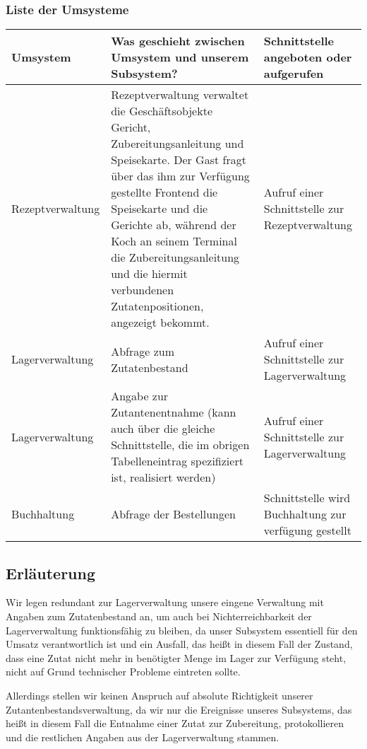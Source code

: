 \subsubsection{Liste der Umsysteme}

\begin{tabu} to \linewidth {X|X|X}
\hline
{}
Umsystem &Was geschieht zwischen Umsystem und unserem Subsystem?
  &Schnittstelle angeboten oder aufgerufen \\
\hline
Rezeptverwaltung &Rezeptverwaltung verwaltet die Gesch\"aftsobjekte Gericht,
  Zubereitungsanleitung und Speisekarte. Der Gast fragt \"uber das ihm zur
  Verf\"ugung gestellte Frontend die Speisekarte und die Gerichte ab, w\"ahrend
  der Koch an seinem Terminal die Zubereitungsanleitung und die hiermit verbundenen
  Zutatenpositionen, angezeigt bekommt.

  &Aufruf einer Schnittstelle zur Rezeptverwaltung \\
\hline
Lagerverwaltung &Abfrage zum Zutatenbestand &Aufruf einer Schnittstelle zur
  Lagerverwaltung \\
\hline
Lagerverwaltung &Angabe zur Zutantenentnahme (kann auch \"uber die gleiche
  Schnittstelle, die im obrigen Tabelleneintrag spezifiziert ist, realisiert
  werden)

  &Aufruf einer Schnittstelle zur Lagerverwaltung \\
\hline
Buchhaltung &Abfrage der Bestellungen &Schnittstelle wird Buchhaltung zur verf\"ugung
  gestellt \\
\hline
\end{tabu}

\subsection*{Erl\"auterung}

Wir legen redundant zur Lagerverwaltung unsere eingene Verwaltung
mit Angaben zum Zutatenbestand an, um auch bei Nichterreichbarkeit
der Lagerverwaltung funktionsf\"ahig zu bleiben, da unser Subsystem
essentiell f\"ur den Umsatz verantwortlich ist und ein Ausfall, das
hei{\ss}t in diesem Fall der Zustand, dass eine Zutat nicht mehr in
ben\"otigter Menge im Lager zur Verf\"ugung steht, nicht auf Grund
technischer Probleme eintreten sollte.

Allerdings stellen wir keinen Anspruch auf absolute Richtigkeit unserer
Zutantenbestandsverwaltung, da wir nur die Ereignisse unseres Subsystems,
das hei{\ss}t in diesem Fall die Entnahme einer Zutat zur Zubereitung,
protokollieren und die restlichen Angaben aus der Lagerverwaltung stammen.

